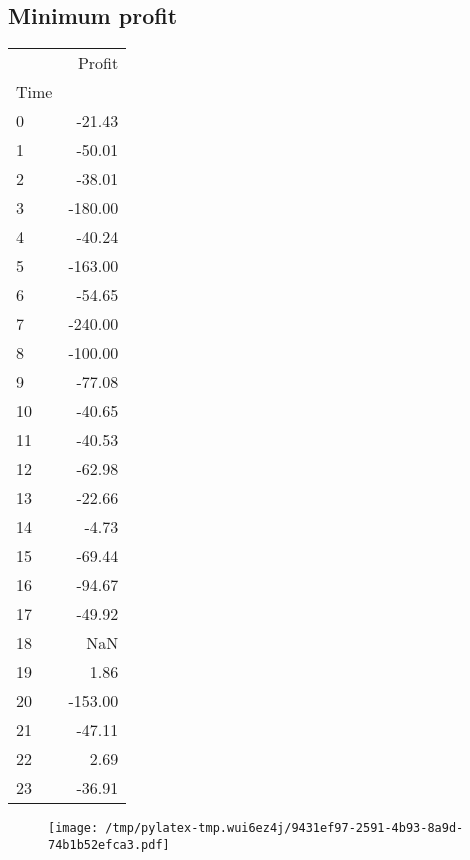 \documentclass{article}%
\begin{document}
\subsection{Minimum profit }%
\label{subsec:Minimumprofit}%
\begin{tabular}{lr}
\toprule
{} &  Profit \\
Time &         \\
\midrule
0    &  -21.43 \\
1    &  -50.01 \\
2    &  -38.01 \\
3    & -180.00 \\
4    &  -40.24 \\
5    & -163.00 \\
6    &  -54.65 \\
7    & -240.00 \\
8    & -100.00 \\
9    &  -77.08 \\
10   &  -40.65 \\
11   &  -40.53 \\
12   &  -62.98 \\
13   &  -22.66 \\
14   &   -4.73 \\
15   &  -69.44 \\
16   &  -94.67 \\
17   &  -49.92 \\
18   &     NaN \\
19   &    1.86 \\
20   & -153.00 \\
21   &  -47.11 \\
22   &    2.69 \\
23   &  -36.91 \\
\bottomrule
\end{tabular}
%


\begin{figure}[htbp]%
\centering%
\texttt{[image: /tmp/pylatex-tmp.wui6ez4j/9431ef97-2591-4b93-8a9d-74b1b52efca3.pdf]}%
\end{figure}

%
\newpage %
\end{document}
